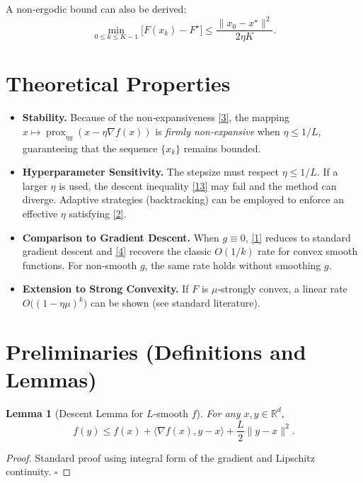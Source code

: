 \documentclass{article}
\newtheorem{lemma}{Lemma}
\newcommand{\prox}{\operatorname{prox}}
\newcommand{\grad}{\nabla}
\newcommand{\R}{\mathbb{R}}
\begin{document}
A non‑ergodic bound can also be derived:
\[
\min_{0\le k\le K-1}\bigl[F(x_k)-F^\star\bigr]\le \frac{\|x_0-x^\star\|^{2}}{2\eta K}.
\tag{5}
\]

\section*{Theoretical Properties}
\begin{itemize}
\item \textbf{Stability.} Because of the non‑expansiveness \eqref{3}, the mapping $x\mapsto\prox_{\eta g}(x-\eta\grad f(x))$ is \emph{firmly non‑expansive} when $\eta\le 1/L$, guaranteeing that the sequence $\{x_k\}$ remains bounded.
\item \textbf{Hyperparameter Sensitivity.} The stepsize must respect $\eta\le 1/L$. If a larger $\eta$ is used, the descent inequality \eqref{13} may fail and the method can diverge. Adaptive strategies (backtracking) can be employed to enforce an effective $\eta$ satisfying \eqref{2}.
\item \textbf{Comparison to Gradient Descent.} When $g\equiv0$, \eqref{1} reduces to standard gradient descent and \eqref{4} recovers the classic $O(1/k)$ rate for convex smooth functions. For non‑smooth $g$, the same rate holds without smoothing $g$.
\item \textbf{Extension to Strong Convexity.} If $F$ is $\mu$‑strongly convex, a linear rate $O\bigl((1-\eta\mu)^{k}\bigr)$ can be shown (see standard literature).
\end{itemize}

\section*{Preliminaries (Definitions and Lemmas)}
\begin{lemma}[Descent Lemma for $L$‑smooth $f$]\label{lem:descent}
For any $x,y\in\R^{d}$,
\[
f(y)\le f(x)+\langle\grad f(x),y-x\rangle+\frac{L}{2}\|y-x\|^{2}.
\tag{6}
\]
\end{lemma}
\begin{proof}
Standard proof using integral form of the gradient and Lipschitz continuity. $\square$
\end{proof}
\end{document}
